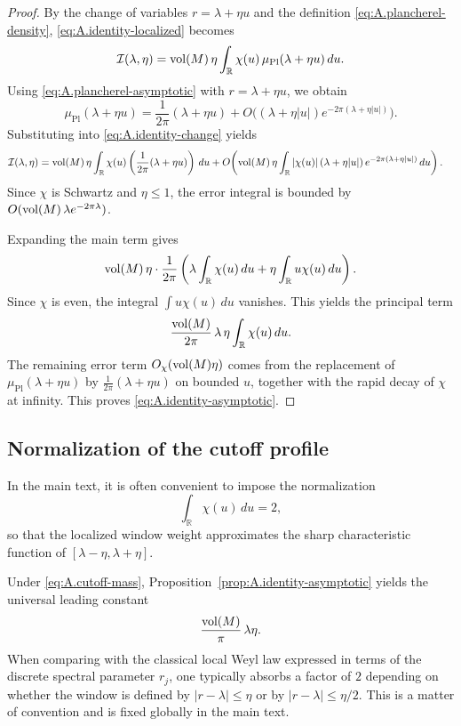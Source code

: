\begin{proof}
By the change of variables $r=\lambda+\eta u$ and the definition \eqref{eq:A.plancherel-density},
\eqref{eq:A.identity-localized} becomes
\begin{equation}
\label{eq:A.identity-change}
\mathcal{I}(\lambda,\eta)
=
\mathop{\mathrm{vol}}\nolimits(M)\,\eta
\int_{\mathbb{R}} \chi(u)\,\mu_{\mathrm{Pl}}(\lambda+\eta u)\,du.
\end{equation}
Using \eqref{eq:A.plancherel-asymptotic} with $r=\lambda+\eta u$, we obtain
\[
\mu_{\mathrm{Pl}}(\lambda+\eta u)
=
\frac{1}{2\pi}(\lambda+\eta u)
+
O\!\bigl((\lambda+\eta|u|)e^{-2\pi(\lambda+\eta|u|)}\bigr).
\]
Substituting into \eqref{eq:A.identity-change} yields
\begin{align*}
\mathcal{I}(\lambda,\eta)
&=
\mathop{\mathrm{vol}}\nolimits(M)\,\eta
\int_{\mathbb{R}} \chi(u)\left(\frac{1}{2\pi}(\lambda+\eta u)\right)\,du
+
O\!\left(
\mathop{\mathrm{vol}}\nolimits(M)\,\eta
\int_{\mathbb{R}} |\chi(u)|\,(\lambda+\eta|u|)\,e^{-2\pi(\lambda+\eta|u|)}\,du
\right).
\end{align*}
Since $\chi$ is Schwartz and $\eta\le 1$, the error integral is bounded by
$O(\mathop{\mathrm{vol}}\nolimits(M)\,\lambda e^{-2\pi\lambda})$.

Expanding the main term gives
\[
\mathop{\mathrm{vol}}\nolimits(M)\,\eta\cdot \frac{1}{2\pi}
\left(
\lambda \int_{\mathbb{R}}\chi(u)\,du
+
\eta\int_{\mathbb{R}} u\chi(u)\,du
\right).
\]
Since $\chi$ is even, the integral $\int u\chi(u)\,du$ vanishes.  This yields the principal term
\[
\frac{\mathop{\mathrm{vol}}\nolimits(M)}{2\pi}\,\lambda\,\eta\int_{\mathbb{R}}\chi(u)\,du.
\]
The remaining error term $O_{\chi}(\mathop{\mathrm{vol}}\nolimits(M)\eta)$ comes from the replacement of
$\mu_{\mathrm{Pl}}(\lambda+\eta u)$ by $\frac{1}{2\pi}(\lambda+\eta u)$ on bounded $u$, together with the rapid decay
of $\chi$ at infinity.  This proves \eqref{eq:A.identity-asymptotic}.
\end{proof}

\subsection{Normalization of the cutoff profile}
\label{subsec:A.cutoff-normalization}

In the main text, it is often convenient to impose the normalization
\begin{equation}
\label{eq:A.cutoff-mass}
\int_{\mathbb{R}}\chi(u)\,du = 2,
\end{equation}
so that the localized window weight approximates the sharp characteristic function of
$[\lambda-\eta,\lambda+\eta]$.

Under \eqref{eq:A.cutoff-mass}, Proposition~\ref{prop:A.identity-asymptotic} yields the universal leading constant
\[
\frac{\mathop{\mathrm{vol}}\nolimits(M)}{\pi}\,\lambda\eta.
\]
When comparing with the classical local Weyl law expressed in terms of the discrete spectral parameter $r_j$, one
typically absorbs a factor of $2$ depending on whether the window is defined by $|r-\lambda|\le \eta$ or by
$|r-\lambda|\le \eta/2$.  This is a matter of convention and is fixed globally in the main text.

